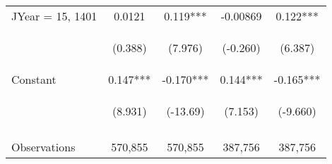 \documentclass[]{standalone}
\begin{document}
\begin{tabular}{lcccc}
    JYear = 15, 1401 & 0.0121                                         & 0.119***                                       & -0.00869                                       & 0.122***                                       \\
    \vspace{4pt}     & \begin{footnotesize}(0.388)\end{footnotesize}  & \begin{footnotesize}(7.976)\end{footnotesize}  & \begin{footnotesize}(-0.260)\end{footnotesize} & \begin{footnotesize}(6.387)\end{footnotesize}  \\
    Constant         & 0.147***                                       & -0.170***                                      & 0.144***                                       & -0.165***                                      \\
                     & \begin{footnotesize}(8.931)\end{footnotesize}  & \begin{footnotesize}(-13.69)\end{footnotesize} & \begin{footnotesize}(7.153)\end{footnotesize}  & \begin{footnotesize}(-9.660)\end{footnotesize} \\
    \vspace{4pt}     & \begin{footnotesize}\end{footnotesize}         & \begin{footnotesize}\end{footnotesize}         & \begin{footnotesize}\end{footnotesize}         & \begin{footnotesize}\end{footnotesize}         \\
    Observations     & 570,855                                        & 570,855                                        & 387,756                                        & 387,756                                        \\

\end{tabular}
\end{document}
